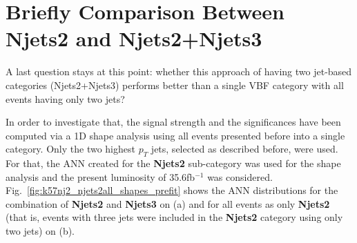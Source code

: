\section{Briefly Comparison Between Njets2 and Njets2+Njets3}
A last question stays at this point: whether this approach of having two jet-based categories (Njets2+Njets3) performs better than a single VBF category with all events having only two jets?

In order to investigate that, the signal strength and the significances have been computed via a 1D shape analysis using all events presented before into a single category. Only the two highest $p_{T}$ jets, selected as described before, were used. For that, the ANN created for the \textbf{Njets2} sub-category was used for the shape analysis and the present luminosity of 35.6fb$^{-1}$ was considered. Fig.~\ref{fig:k57nj2_njets2all_shapes_prefit} shows the ANN distributions for the combination of \textbf{Njets2} and \textbf{Njets3} on (a) and for all events as only \textbf{Njets2} (that is, events with three jets were included in the \textbf{Njets2} category using only two jets) on (b).

